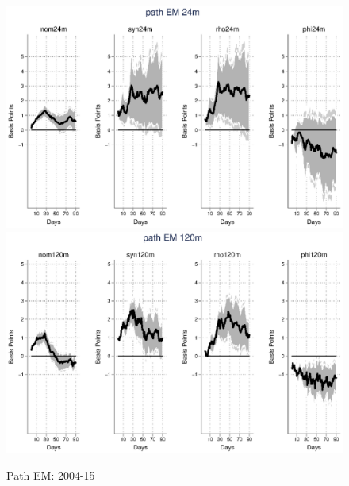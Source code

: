\documentclass{article}
\begin{document}
\begin{figure}[tbph]
	\begin{center}
		\caption{Path EM: 2004-15}
		\includegraphics[trim={0cm 0cm 0cm 0cm},clip,height=0.5\textheight,width=1\textwidth]{../LagDep-FX/Path/EM/PathEM24m.eps} \\
		\includegraphics[trim={0cm 0cm 0cm 0cm},clip,height=0.5\textheight,width=1\textwidth]{../LagDep-FX/Path/EM/PathEM120m.eps} \\
	\end{center}
\end{figure}

\pagebreak[4]
\end{document}
